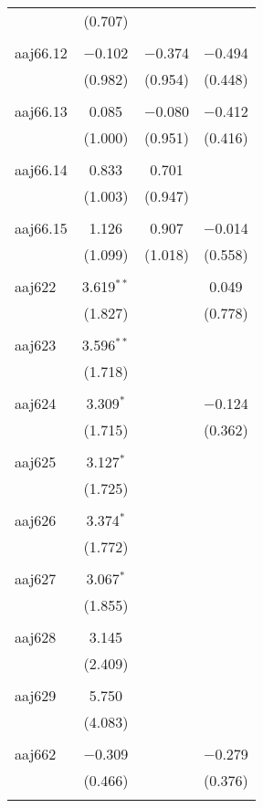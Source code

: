\begin{table}[!htbp]
\begin{tabular}{@{\extracolsep{5pt}}lccc}
  & (0.707) &  &  \\ 
  & & & \\ 
 aaj66.12 & $-$0.102 & $-$0.374 & $-$0.494 \\ 
  & (0.982) & (0.954) & (0.448) \\ 
  & & & \\ 
 aaj66.13 & 0.085 & $-$0.080 & $-$0.412 \\ 
  & (1.000) & (0.951) & (0.416) \\ 
  & & & \\ 
 aaj66.14 & 0.833 & 0.701 &  \\ 
  & (1.003) & (0.947) &  \\ 
  & & & \\ 
 aaj66.15 & 1.126 & 0.907 & $-$0.014 \\ 
  & (1.099) & (1.018) & (0.558) \\ 
  & & & \\ 
 aaj622 & 3.619$^{**}$ &  & 0.049 \\ 
  & (1.827) &  & (0.778) \\ 
  & & & \\ 
 aaj623 & 3.596$^{**}$ &  &  \\ 
  & (1.718) &  &  \\ 
  & & & \\ 
 aaj624 & 3.309$^{*}$ &  & $-$0.124 \\ 
  & (1.715) &  & (0.362) \\ 
  & & & \\ 
 aaj625 & 3.127$^{*}$ &  &  \\ 
  & (1.725) &  &  \\ 
  & & & \\ 
 aaj626 & 3.374$^{*}$ &  &  \\ 
  & (1.772) &  &  \\ 
  & & & \\ 
 aaj627 & 3.067$^{*}$ &  &  \\ 
  & (1.855) &  &  \\ 
  & & & \\ 
 aaj628 & 3.145 &  &  \\ 
  & (2.409) &  &  \\ 
  & & & \\ 
 aaj629 & 5.750 &  &  \\ 
  & (4.083) &  &  \\ 
  & & & \\ 
 aaj662 & $-$0.309 &  & $-$0.279 \\ 
  & (0.466) &  & (0.376) \\ 
  & & & \\ 

\end{tabular}
\end{table}
